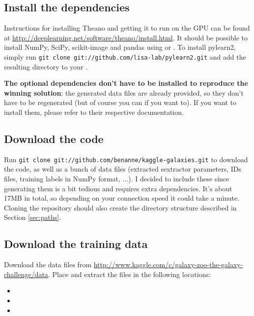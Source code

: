 \documentclass[a4paper,10pt]{article}
\begin{document}
\subsection{Install the dependencies}

Instructions for installing Theano and getting it to run on the GPU can be found at \url{http://deeplearning.net/software/theano/install.html}. It should be possible to install NumPy, SciPy, scikit-image and pandas using  or . To install pylearn2, simply run \texttt{git clone git://github.com/lisa-lab/pylearn2.git} and add the resulting directory to your .

\textbf{The optional dependencies don't have to be installed to reproduce the winning solution}: the generated data files are already provided, so they don't have to be regenerated (but of course you can if you want to). If you want to install them, please refer to their respective documentation.

\subsection{Download the code}

Run \texttt{git clone git://github.com/benanne/kaggle-galaxies.git} to download the code, as well as a bunch of data files (extracted sextractor parameters, IDs files, training labels in NumPy format, ...). I decided to include these since generating them is a bit tedious and requires extra dependencies. It's about 17MB in total, so depending on your connection speed it could take a minute. Cloning the repository should also create the directory structure described in Section \ref{sec:paths}.

\subsection{Download the training data}

Download the data files from \url{http://www.kaggle.com/c/galaxy-zoo-the-galaxy-challenge/data}. Place and extract the files in the following locations:

\begin{itemize}
 \item {}
 \item {}
 \item {}
\end{itemize}
\end{document}
